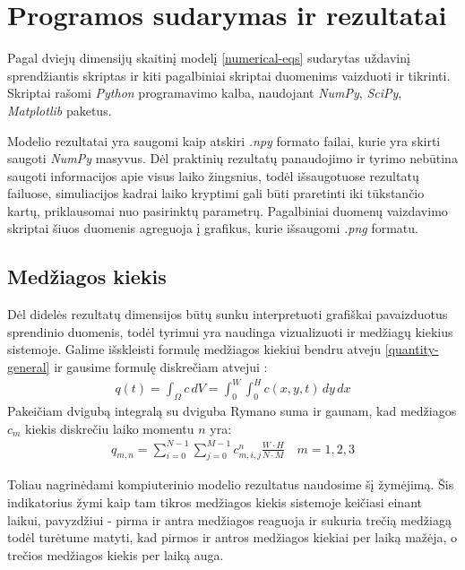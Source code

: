 \section{Programos sudarymas ir rezultatai}

Pagal dviejų dimensijų skaitinį modelį \eqref{numerical-eqs} sudarytas uždavinį sprendžiantis skriptas ir kiti pagalbiniai skriptai duomenims vaizduoti ir tikrinti. Skriptai rašomi \textit{Python} programavimo kalba, naudojant \textit{NumPy}, \textit{SciPy}, \textit{Matplotlib} paketus. 

Modelio rezultatai yra saugomi kaip atskiri \textit{.npy} formato failai, kurie yra skirti saugoti \mbox{\textit{NumPy}} masyvus. Dėl praktinių rezultatų panaudojimo ir tyrimo nebūtina saugoti informacijos apie visus laiko žingsnius, todėl išsaugotuose rezultatų failuose, simuliacijos kadrai laiko kryptimi gali būti praretinti iki tūkstančio kartų, priklausomai nuo pasirinktų parametrų. Pagalbiniai duomenų vaizdavimo skriptai šiuos duomenis agreguoja į grafikus, kurie išsaugomi \textit{.png} formatu.

\subsection*{Medžiagos kiekis}

Dėl didelės rezultatų dimensijos būtų sunku interpretuoti grafiškai pavaizduotus sprendinio duomenis, todėl tyrimui yra naudinga vizualizuoti ir medžiagų kiekius sistemoje. Galime išskleisti formulę medžiagos kiekiui bendru atveju \eqref{quantity-general} ir gausime formulę diskrečiam atvejui \cite{strangCalculusVolume32016}:
\begin{align}
    q(t) = \int_\Omega c\,dV = \int_0^W \int_0^H c(x, y, t)\,dy\,dx
\end{align}
Pakeičiam dvigubą integralą su dviguba Rymano suma ir gaunam, kad medžiagos $c_m$ kiekis diskrečiu laiko momentu $n$ yra:
\begin{align}
    q_{m, n}= \sum_{i=0}^{N-1}\sum_{j=0}^{M-1} c_{m, i,j}^n \frac{W\cdot H}{N\cdot M} \quad m=1, 2, 3
\end{align}

Toliau nagrinėdami kompiuterinio modelio rezultatus naudosime šį žymėjimą. Šis indikatorius žymi kaip tam tikros medžiagos kiekis sistemoje keičiasi einant laikui, pavyzdžiui - pirma ir antra medžiagos reaguoja ir sukuria trečią medžiagą todėl turėtume matyti, kad pirmos ir antros medžiagos kiekiai per laiką mažėja, o trečios medžiagos kiekis per laiką auga.   

